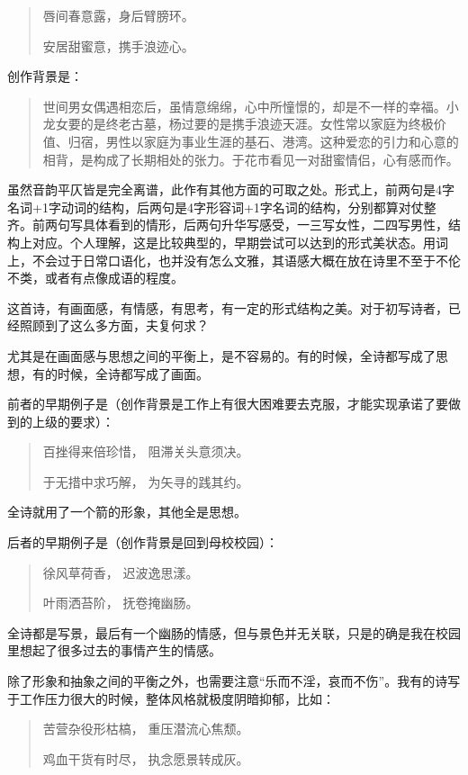 \documentclass{article}
\begin{document}
\begin{quote}
唇间春意露，身后臂膀环。

安居甜蜜意，携手浪迹心。
\end{quote}

创作背景是：

\begin{quote}
世间男女偶遇相恋后，虽情意绵绵，心中所憧憬的，却是不一样的幸福。小龙女要的是终老古墓，杨过要的是携手浪迹天涯。女性常以家庭为终极价值、归宿，男性以家庭为事业生涯的基石、港湾。这种爱恋的引力和心意的相背，是构成了长期相处的张力。于花市看见一对甜蜜情侣，心有感而作。
\end{quote}

虽然音韵平仄皆是完全离谱，此作有其他方面的可取之处。形式上，前两句是4字名词+1字动词的结构，后两句是4字形容词+1字名词的结构，分别都算对仗整齐。前两句写具体看到的情形，后两句升华写感受，一三写女性，二四写男性，结构上对应。个人理解，这是比较典型的，早期尝试可以达到的形式美状态。用词上，不会过于日常口语化，也并没有怎么文雅，其语感大概在放在诗里不至于不伦不类，或者有点像成语的程度。

这首诗，有画面感，有情感，有思考，有一定的形式结构之美。对于初写诗者，已经照顾到了这么多方面，夫复何求？

尤其是在画面感与思想之间的平衡上，是不容易的。有的时候，全诗都写成了思想，有的时候，全诗都写成了画面。

前者的早期例子是（创作背景是工作上有很大困难要去克服，才能实现承诺了要做到的上级的要求）：

\begin{quote}
百挫得来倍珍惜， 阻滞关头意须决。

于无措中求巧解， 为矢寻的践其约。
\end{quote}

全诗就用了一个箭的形象，其他全是思想。

后者的早期例子是（创作背景是回到母校校园）：

\begin{quote}
徐风草荷香， 迟波逸思漾。

叶雨洒苔阶， 抚卷掩幽肠。
\end{quote}

全诗都是写景，最后有一个幽肠的情感，但与景色并无关联，只是的确是我在校园里想起了很多过去的事情产生的情感。

除了形象和抽象之间的平衡之外，也需要注意``乐而不淫，哀而不伤''。我有的诗写于工作压力很大的时候，整体风格就极度阴暗抑郁，比如：

\begin{quote}
苦营杂役形枯槁， 重压潜流心焦颓。

鸡血干货有时尽， 执念愿景转成灰。
\end{quote}
\end{document}
